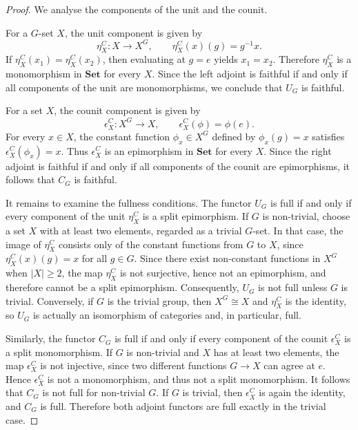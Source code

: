 \documentclass[10pt,a4paper]{amsart}
\begin{document}
\begin{proof}
We analyse the components of the unit and the counit.

For a $G$-set $X$, the unit component is given by
\[
\eta^C_X \colon X \longrightarrow X^G, \qquad \eta^C_X(x)(g) = g^{-1}x.
\]
If $\eta^C_X(x_1) = \eta^C_X(x_2)$, then evaluating at $g = e$ yields $x_1 = x_2$. Therefore $\eta^C_X$ is a monomorphism in $\mathbf{Set}$ for every $X$. Since the left adjoint is faithful if and only if all components of the unit are monomorphisms, we conclude that $U_G$ is faithful.

For a set $X$, the counit component is given by
\[
\epsilon^C_X \colon X^G \longrightarrow X, \qquad \epsilon^C_X(\phi) = \phi(e).
\]
For every $x \in X$, the constant function $\phi_x \in X^G$ defined by $\phi_x(g) = x$ satisfies $\epsilon^C_X(\phi_x) = x$. Thus $\epsilon^C_X$ is an epimorphism in $\mathbf{Set}$ for every $X$. Since the right adjoint is faithful if and only if all components of the counit are epimorphisms, it follows that $C_G$ is faithful.

It remains to examine the fullness conditions. The functor $U_G$ is full if and only if every component of the unit $\eta^C_X$ is a split epimorphism. If $G$ is non-trivial, choose a set $X$ with at least two elements, regarded as a trivial $G$-set. In that case, the image of $\eta^C_X$ consists only of the constant functions from $G$ to $X$, since $\eta^C_X(x)(g) = x$ for all $g \in G$. Since there exist non-constant functions in $X^G$ when $|X| \geq 2$, the map $\eta^C_X$ is not surjective, hence not an epimorphism, and therefore cannot be a split epimorphism. Consequently, $U_G$ is not full unless $G$ is trivial. Conversely, if $G$ is the trivial group, then $X^G \cong X$ and $\eta^C_X$ is the identity, so $U_G$ is actually an isomorphism of categories and, in particular, full.

Similarly, the functor $C_G$ is full if and only if every component of the counit $\epsilon^C_X$ is a split monomorphism. If $G$ is non-trivial and $X$ has at least two elements, the map $\epsilon^C_X$ is not injective, since two different functions $G \rightarrow X$ can agree at $e$. Hence $\epsilon^C_X$ is not a monomorphism, and thus not a split monomorphism. It follows that $C_G$ is not full for non-trivial $G$. If $G$ is trivial, then $\epsilon^C_X$ is again the identity, and $C_G$ is full. Therefore both adjoint functors are full exactly in the trivial case.
\end{proof}
\end{document}
